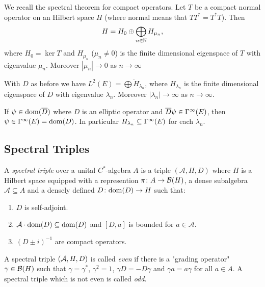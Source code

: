 \begin{remark}
 We recall the spectral theorem for compact operators. Let $T$ be a compact normal operator on an Hilbert space $H$ (where normal means that $TT^\ast=T^\ast T$). Then $$H=H_0\oplus\bigoplus_{n\in\mathbb{N}}H_{\mu_n},$$
 where $H_0=\ker T$ and $H_{\mu_n}$ ($\mu_n\neq 0$) is the finite dimensional eigenspace of $T$ with eigenvalue $\mu_n$. Moreover $|\mu_n|\to 0$ as $n\to\infty$ 
\end{remark}
\begin{corollary}
 With $D$ as before  we have $L^2(E)=\overline{\bigoplus H_{\lambda_n}}$, where $H_{\lambda_n}$ is the finite dimensional eigenspace of $D$ with eigenvalue $\lambda_n$. Moreover $|\lambda_n|\to\infty$ as $n\to\infty$.
\end{corollary}
\begin{theorem} If $\psi\in\mathrm{dom}(\overline{D})$ where $D$ is an elliptic operator and $\overline{D}\psi\in\Gamma^\infty(E)$, then $\psi\in\Gamma^\infty(E)=\mathrm{dom}(D)$. In particular $H_{\lambda_n}\subseteq\Gamma^\infty(E)$ for each $\lambda_n$.
\end{theorem}
\subsection{Spectral Triples}
\begin{definition}
 A \emph{spectral triple} over a unital $C^\ast$-algebra $A$ is a triple $(\mathcal A,H,D)$ where $H$ is a Hilbert space equipped with a represention $\pi\colon A\to\mathcal{B}(H)$, a dense subalgebra $\mathcal A\subseteq A$ and a densely defined $D\colon\mathrm{dom}(D)\to H$ such that: 
 \begin{enumerate}
  \item $D$ is self-adjoint.
  \item $\mathcal A\cdot\mathrm{dom}(D)\subseteq\mathrm{dom}(D)$ and $[D,a]$ is bounded for $a\in\mathcal A$.
  \item $(D\pm i)^{-1}$ are compact operators.
 \end{enumerate}
\end{definition}

\begin{definition}
 A spectral triple $(\mathcal{A},H,D)$ is called \emph{even} if there is a "grading operator" $\gamma\in\mathcal{B}(H)$ such that $\gamma=\gamma^\ast$, $\gamma^2=1$, $\gamma D=-D\gamma$ and $\gamma a =a\gamma$ for all $a\in A$. A spectral triple which is not even is called \emph{odd}.
\end{definition}

